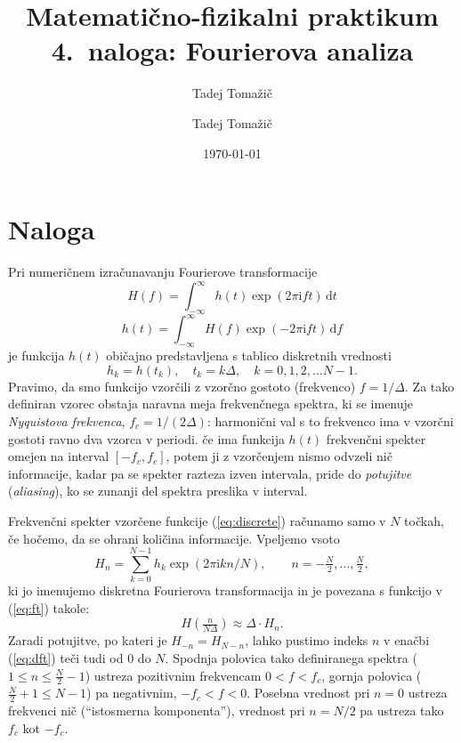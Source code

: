 \documentclass[slovene,11pt,a4paper]{article}
\title{
\sc\large Matematično-fizikalni praktikum \thisyear \\
\bigskip
\bf\Large 4.~naloga: Fourierova analiza
}
\author{Tadej Tomažič}
\newcommand{\dd}{\,\mathrm{d}}
\newcommand{\ii}{\mathrm{i}}
\begin{document}
\author{Tadej Tomažič}
\date{\today}

\maketitle

\newpage
{}
\tableofcontents
\listoffigures
\newpage


\section{Naloga}
Pri numeričnem izračunavanju Fourierove transformacije
\begin{equation}
H(f) = \int_{-\infty}^\infty
h(t)\exp(2 \pi \ii f t)\dd t
\label{eq:ft}
\end{equation}
\begin{equation}
h(t) = \int_{-\infty}^\infty
H(f)\exp(-2 \pi \ii f t)\dd f
\end{equation}
je funkcija $h(t)$ običajno predstavljena s tablico diskretnih
vrednosti
\begin{equation}
  h_k = h(t_k),\quad t_k = k \Delta, \quad k=0,1,2,\dots N-1.
  \label{eq:discrete}
\end{equation}
Pravimo, da smo funkcijo vzorčili z vzorčno gostoto (frekvenco) $f=1/\Delta$.
Za tako definiran vzorec obstaja naravna meja frekvenčnega spektra,
ki se imenuje {\sl Nyquistova frekvenca}, $f_c =1/(2\Delta)$:
harmonični val s to frekvenco ima v vzorčni gostoti ravno
dva vzorca v periodi.
če ima funkcija $h(t)$ frekvenčni spekter omejen na interval
$[-f_c, f_c ]$, potem ji z vzorčenjem nismo odvzeli nič informacije,
kadar pa se spekter razteza izven intervala, pride do {\sl potujitve\/}
({\sl aliasing\/}), ko se zunanji del spektra preslika v interval.

Frekvenčni spekter vzorčene funkcije (\ref{eq:discrete}) računamo samo
v $N$ točkah, če hočemo, da se ohrani količina informacije.
Vpeljemo vsoto
\begin{equation}
H_n = \sum_{k=0}^{N-1}
h_k \exp(2 \pi \ii k n / N),
\qquad n=-\tfrac{N}{2},\dots ,\tfrac{N}{2},
\label{eq:dft}
\end{equation}
ki jo imenujemo diskretna Fourierova transformacija
in je povezana s funkcijo v (\ref{eq:ft}) takole:
\begin{equation*}
H(\tfrac{n}{N\Delta}) \approx \Delta\cdot H_n .
\end{equation*}
Zaradi potujitve, po kateri je $H_{-n} = H_{N-n}$, lahko pustimo
indeks $n$ v enačbi (\ref{eq:dft}) teči tudi od 0 do $N$. Spodnja polovica
tako definiranega spektra ($1 \le n \le \tfrac{N}{2}-1$) ustreza pozitivnim
frekvencam $0 < f < f_c$, gornja polovica ($\tfrac{N}{2}+1 \le N-1$)
pa negativnim, $-f_c < f < 0$.  Posebna vrednost pri $n=0$
ustreza frekvenci nič (``istosmerna komponenta''), vrednost
pri $n=N/2$ pa ustreza tako $f_c$ kot $-f_c$.
\end{document}
